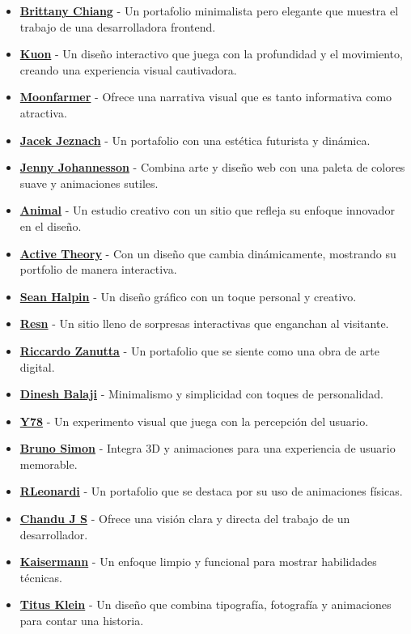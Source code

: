 \documentclass[
  jou,
  floatsintext,
  longtable,
  a4paper,
  nolmodern,
  notxfonts,
  notimes,
  colorlinks=true,linkcolor=blue,citecolor=blue,urlcolor=blue]{apa7}
\providecommand{\tightlist}{%
  \setlength{\itemsep}{0pt}\setlength{\parskip}{0pt}}
\begin{document}
\begin{itemize}
\tightlist
\item
  \href{https://brittanychiang.com/}{\textbf{Brittany Chiang}} - Un
  portafolio minimalista pero elegante que muestra el trabajo de una
  desarrolladora frontend.
\item
  \href{https://kuon.space/}{\textbf{Kuon}} - Un diseño interactivo que
  juega con la profundidad y el movimiento, creando una experiencia
  visual cautivadora.
\item
  \href{https://moonfarmer.com/}{\textbf{Moonfarmer}} - Ofrece una
  narrativa visual que es tanto informativa como atractiva.
\item
  \href{https://jacekjeznach.com/}{\textbf{Jacek Jeznach}} - Un
  portafolio con una estética futurista y dinámica.
\item
  \href{http://www.jennyjohannesson.com/}{\textbf{Jenny Johannesson}} -
  Combina arte y diseño web con una paleta de colores suave y
  animaciones sutiles.
\item
  \href{https://animalmade.com/}{\textbf{Animal}} - Un estudio creativo
  con un sitio que refleja su enfoque innovador en el diseño.
\item
  \href{https://activetheory.net/home}{\textbf{Active Theory}} - Con un
  diseño que cambia dinámicamente, mostrando su portfolio de manera
  interactiva.
\item
  \href{https://www.seanhalpin.design/}{\textbf{Sean Halpin}} - Un
  diseño gráfico con un toque personal y creativo.
\item
  \href{https://resn.co.nz/\#!/about}{\textbf{Resn}} - Un sitio lleno de
  sorpresas interactivas que enganchan al visitante.
\item
  \href{http://riccardozanutta.com/}{\textbf{Riccardo Zanutta}} - Un
  portafolio que se siente como una obra de arte digital.
\item
  \href{https://dineshbalaji.in/}{\textbf{Dinesh Balaji}} - Minimalismo
  y simplicidad con toques de personalidad.
\item
  \href{http://y78.fr/2/}{\textbf{Y78}} - Un experimento visual que
  juega con la percepción del usuario.
\item
  \href{https://bruno-simon.com/}{\textbf{Bruno Simon}} - Integra 3D y
  animaciones para una experiencia de usuario memorable.
\item
  \href{http://www.rleonardi.com/}{\textbf{RLeonardi}} - Un portafolio
  que se destaca por su uso de animaciones físicas.
\item
  \href{https://chandujs.dev/}{\textbf{Chandu J S}} - Ofrece una visión
  clara y directa del trabajo de un desarrollador.
\item
  \href{https://kaisermann.me/}{\textbf{Kaisermann}} - Un enfoque limpio
  y funcional para mostrar habilidades técnicas.
\item
  \href{https://titusklein.com/}{\textbf{Titus Klein}} - Un diseño que
  combina tipografía, fotografía y animaciones para contar una historia.
\end{itemize}
\end{document}
